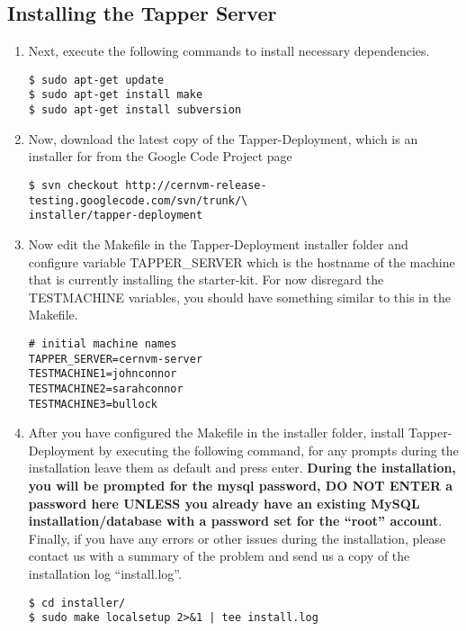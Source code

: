 \newpage
\subsection{Installing the Tapper Server}
\begin{enumerate}
\item 	Next, execute the following commands to install necessary dependencies.

\lstset{language=bash,caption= Install Dependencies}
\begin{lstlisting}
$ sudo apt-get update
$ sudo apt-get install make
$ sudo apt-get install subversion
\end{lstlisting}

\item 	Now, download the latest copy of the Tapper-Deployment, which is an installer for \tapper from the \cernvmreleasetesting 
		Google Code Project page

\lstset{language=bash,caption= Download Tapper-Deployment}
\begin{lstlisting}
$ svn checkout http://cernvm-release-testing.googlecode.com/svn/trunk/\
installer/tapper-deployment
\end{lstlisting}

\item 	Now edit the Makefile in the Tapper-Deployment installer folder and configure variable TAPPER\_SERVER which 
		is the hostname of the machine that is currently installing the starter-kit. For now disregard the TESTMACHINE 
		variables, you should have something similar to this in the Makefile.

\lstset{language=bash,caption= Makefile Configuration}
\begin{lstlisting}
# initial machine names
TAPPER_SERVER=cernvm-server
TESTMACHINE1=johnconnor
TESTMACHINE2=sarahconnor
TESTMACHINE3=bullock
\end{lstlisting}

\item	After you have configured the Makefile in the installer folder, install Tapper-Deployment by executing the
		following command, for any prompts during the installation leave them as default and press enter. {\bf During
		the installation, you will be prompted for the mysql password, DO NOT ENTER a password here UNLESS you already have an
		existing MySQL installation/database with a password set for the ``root'' account}. Finally, if you have any errors or
		other issues during the installation, please contact us with a summary of the problem and send us a copy of the installation 
		log ``install.log''. 

\lstset{language=bash,caption= Install Tapper-Deployment}
\begin{lstlisting}
$ cd installer/
$ sudo make localsetup 2>&1 | tee install.log
\end{lstlisting}
\end{enumerate}


